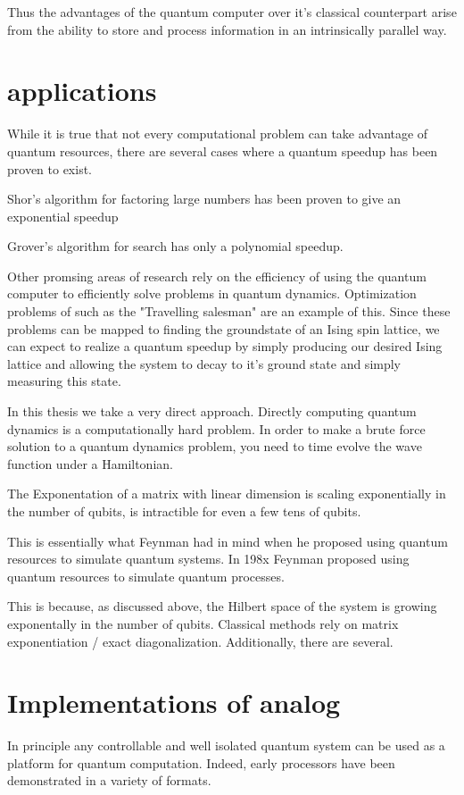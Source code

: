 Thus the advantages of the quantum computer over it's classical counterpart arise from the ability to store and process information in an intrinsically parallel way.

\section{applications}
While it is true that not every computational problem can take advantage of quantum resources, there are several cases where a quantum speedup has been proven to exist.

Shor's algorithm for factoring large numbers has been proven to give an exponential speedup

Grover's algorithm for search has only a polynomial speedup.

Other promsing areas of research rely on the efficiency of using the quantum computer to efficiently solve problems in quantum dynamics.
Optimization problems of such as the "Travelling salesman" are an example of this.  Since these problems can be mapped to finding the groundstate of an Ising spin lattice,
we can expect to realize a quantum speedup by simply producing our desired Ising lattice and allowing the system to decay to it's ground state and simply measuring this state.

In this thesis we take a very direct approach.
Directly computing quantum dynamics is a computationally hard problem.
In order to make a brute force solution to a quantum dynamics problem, you need to time evolve the wave function under a Hamiltonian.

The Exponentation of a matrix with linear dimension is scaling exponentially in the number of qubits, is intractible for even a few tens of qubits.

This is essentially what Feynman had in mind when he proposed using quantum resources to simulate quantum systems.
In 198x Feynman proposed using quantum resources to simulate quantum processes.

This is because, as discussed above, the Hilbert space of the system is growing exponentally in the number of qubits.
Classical methods rely on matrix exponentiation / exact diagonalization.
Additionally, there are several.

\section{Implementations of analog}
In principle any controllable and well isolated quantum system can be used as a platform for quantum computation.
Indeed, early processors have been demonstrated in a variety of formats.

